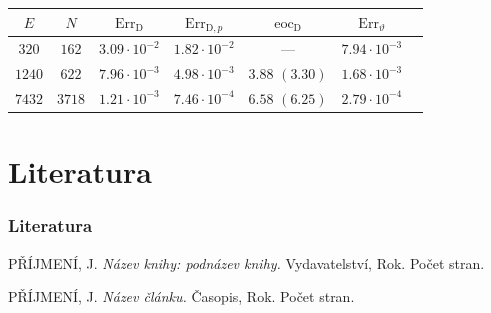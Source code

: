 \documentclass[lualatex,hyperref={pdfencoding=auto}]{beamer}
\begin{document}
\begin{frame}
\begin{columns}
\begin{column}{0.5\textwidth}
\begin{center}
			\end{center}
		\end{column}
	\end{columns}
	\begin{center}
		\begin{tabular}{ccccccc}
			\toprule
			$E$ & $N$ & $\mathrm{Err}_{\mathrm{D}}$ & $\mathrm{Err}_{\mathrm{D},p}$ & $\mathrm{eoc}_\mathrm{D}$ & $\mathrm{Err}_{\vartheta}$ \\
			\midrule
			$320$ & $162$ & $3.09 \cdot 10^{-2}$ & $1.82 \cdot 10^{-2}$ & --- & $7.94 \cdot 10^{-3}$ \\
			$1240$ & $622$ & $7.96 \cdot 10^{-3}$ & $4.98 \cdot 10^{-3}$ & $3.88$ $(3.30)$ & $1.68 \cdot 10^{-3}$ \\
			$7432$ & $3718$ & $1.21 \cdot 10^{-3}$ & $7.46 \cdot 10^{-4}$ & $6.58$ $(6.25)$ & $2.79 \cdot 10^{-4}$ \\
			\bottomrule
		\end{tabular}
	\end{center}
\end{frame}

\section{Literatura}
\begin{frame}
	\frametitle{Literatura}
	\begin{thebibliography}{99}
		PŘÍJMENÍ, J.
		\newblock\textit{Název knihy: podnázev knihy.} 
		\newblock Vydavatelství, Rok. Počet stran.

		PŘÍJMENÍ, J.
		\newblock\textit{Název článku.} 
		\newblock Časopis, Rok. Počet stran.
\end{thebibliography}
\end{frame}
\end{document}
